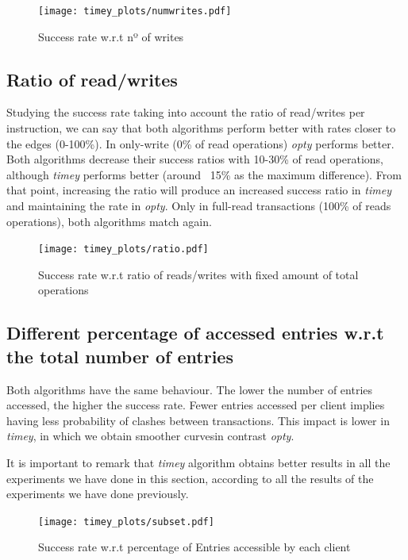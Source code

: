 \documentclass[a4paper, 10pt]{article}
\begin{document}
\begin{figure}[H]
  \centering
  \texttt{[image: timey\_plots/numwrites.pdf]}
    \caption{Success rate w.r.t nº of writes}
    \label{timey:numwrites}
\end{figure} 

\clearpage
\subsection{Ratio of read/writes}

Studying the success rate taking into account the ratio of read/writes per instruction, we can say that both algorithms perform better with rates closer to the edges (0-100\%). In only-write (0\% of read operations) \textit{opty} performs better. Both algorithms decrease their success ratios with 10-30\% of read operations, although \textit{timey} performs better (around ~15\% as the maximum difference). From that point, increasing the ratio will produce an increased success ratio in \textit{timey} and maintaining the rate in \textit{opty}. Only in full-read transactions (100\% of reads operations), both algorithms match again.

\begin{figure}[H]
  \centering
  \texttt{[image: timey\_plots/ratio.pdf]}
    \caption{Success rate w.r.t ratio of reads/writes with fixed amount of total operations}
    \label{timey:ratio}
\end{figure} 

\clearpage
\subsection{Different percentage of accessed entries w.r.t the total number of entries}

Both algorithms have the same behaviour. The lower the number of entries accessed, the higher the success rate. Fewer entries accessed per client implies having less probability of clashes between transactions. This impact is lower in \textit{timey}, in which we obtain smoother curvesin contrast \textit{opty}.

It is important to remark that \textit{timey} algorithm obtains better results in all the experiments we have done in this section, according to all the results of the experiments we have done previously.

\begin{figure}[H]
  \centering
  \texttt{[image: timey\_plots/subset.pdf]}
    \caption{Success rate w.r.t percentage of Entries accessible by each client}
    \label{timey:subset}
\end{figure} 
\end{document}
